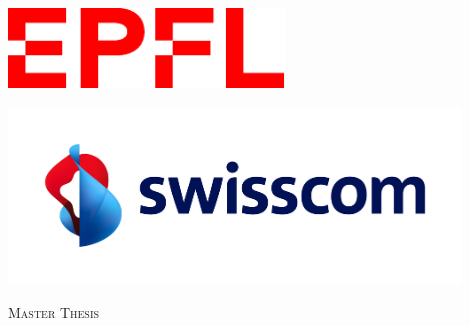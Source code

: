 \begin{titlepage}
    \begin{center}
    
    \begin{minipage}{0.4\textwidth}
        \begin{flushleft} \large
        \includegraphics[width=0.55\textwidth]{Head/images/Logo_EPFL.pdf}\\[1cm]
        \end{flushleft}
    \end{minipage}
    \begin{minipage}{0.4\textwidth}
        \begin{flushright} \large
        \includegraphics[width=0.9\textwidth]{Head/images/Swisscom_Horizontal_RGB_Colour_Navy.png}\\[1cm]
        \end{flushright}
    \end{minipage}
          
    \vspace{3cm}
         
    \textsc{\Large Master Thesis}\\[0.5cm] %
    
    \HRule \\[0.4cm] %
    {\huge \bfseries \ttitle\par}\vspace{0.4cm} %
    \HRule \\[1.5cm] %
     

\end{center}
\end{titlepage}
